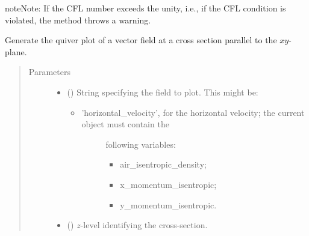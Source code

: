 \documentclass[letterpaper,10pt,english]{sphinxmanual}
\begin{document}
\begin{fulllineitems}
\begin{fulllineitems}
\begin{quote}
\begin{description}
\end{description}\end{quote}

\begin{sphinxadmonition}{note}{Note:}
If the CFL number exceeds the unity, i.e., if the CFL condition is violated, the method throws a warning.
\end{sphinxadmonition}

\end{fulllineitems}


\begin{fulllineitems}
\label{\detokenize{api:storages.state_isentropic.StateIsentropic.quiver_xy}}
Generate the quiver plot of a vector field at a cross section parallel to the \(xy\)-plane.
\begin{quote}\begin{description}
\item[{Parameters}] \leavevmode\begin{itemize}
\item {} 
 () \textendash{} 
String specifying the field to plot. This might be:
\begin{itemize}
\item {} \begin{description}
\item[{’horizontal\_velocity’, for the horizontal velocity; the current object must contain the}] \leavevmode
following variables:
\begin{itemize}
\item {} 
air\_isentropic\_density;

\item {} 
x\_momentum\_isentropic;

\item {} 
y\_momentum\_isentropic.

\end{itemize}

\end{description}

\end{itemize}


\item {} 
 () \textendash{} \(z\)-level identifying the cross-section.


\end{itemize}
\end{description}
\end{quote}
\end{fulllineitems}
\end{fulllineitems}
\end{document}
